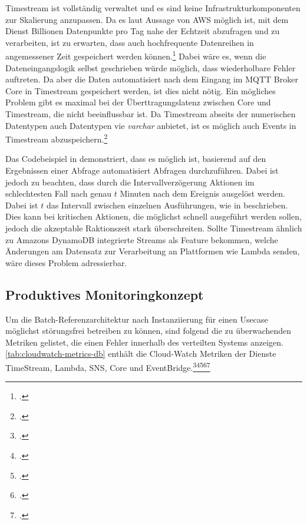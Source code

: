 Timestream ist vollständig verwaltet und es sind keine Infrastrukturkomponenten zur Skalierung anzupassen. Da es laut Aussage von \ac{AWS} möglich ist, mit dem Dienst Billionen Datenpunkte pro Tag nahe der Echtzeit abzufragen und zu verarbeiten, ist zu erwarten, dass auch hochfrequente Datenreihen in angemessener Zeit gespeichert werden können.\footcite[Vgl.][]{AmazonWebServicesInc..2020g} Dabei wäre es, wenn die Dateneingangslogik selbst geschrieben würde möglich, dass wiederholbare Fehler auftreten. Da aber die Daten automatisiert nach dem Eingang im \ac{MQTT} Broker \AWSIOT{} Core in Timestream gespeichert werden, ist dies nicht nötig. Ein mögliches Problem gibt es maximal bei der Überttragungslatenz zwischen \AWSIOT{} Core und Timestream, die nicht beeinflussbar ist.
Da Timestream abseits der numerischen Datentypen auch Datentypen vie \textit{varchar} anbietet, ist es möglich auch Events in Timestream abzuspeichern.\footcite[Vgl.][]{AmazonWebServicesInc..o.J.r}


Das Codebeispiel in  demonstriert, dass es möglich ist, basierend auf den Ergebnissen einer Abfrage automatisiert Abfragen durchzuführen. Dabei ist jedoch zu beachten, dass durch die Intervallverzögerung Aktionen im schlechtesten Fall nach genau $t$ Minuten nach dem Ereignis ausgelöst werden. Dabei ist $t$ das Intervall zwischen einzelnen Ausführungen, wie in  beschrieben. Dies kann bei kritischen Aktionen, die möglichst schnell ausgeführt werden sollen, jedoch die akzeptable Raktionszeit stark überschreiten. Sollte Timestream ähnlich zu Amazons DynamoDB integrierte Streams als Feature bekommen, welche Änderungen am Datensatz zur Verarbeitung an Plattformen wie Lambda senden, wäre dieses Problem adressierbar.

\subsection{Produktives Monitoringkonzept}\label{subsection:Produktives-Monitoringkonzep-B}
Um die Batch-Referenzarchitektur nach Instanziierung für einen Usecase möglichst störungsfrei betreiben zu können, sind folgend die zu überwachenden Metriken gelistet, die einen Fehler innerhalb des verteilten Systems anzeigen. \autoref{tab:cloudwatch-metrics-db} enthält die Cloud-Watch Metriken der Dienste TimeStream, Lambda, \ac{SNS}, \AWSIOT{} Core und EventBridge.\footcite[Vgl.][]{AmazonWebServicesInc..o.J.be}\nzitat\footcite[Vgl.][]{AmazonWebServicesInc..o.J.bf}\nzitat\footcite[Vgl.][]{AmazonWebServicesInc..o.J.bc}\nzitat\footcite[Vgl.][]{AmazonWebServicesInc..o.J.az}\nzitat\footcite[Vgl.][]{AmazonWebServicesInc..o.J.bl}


